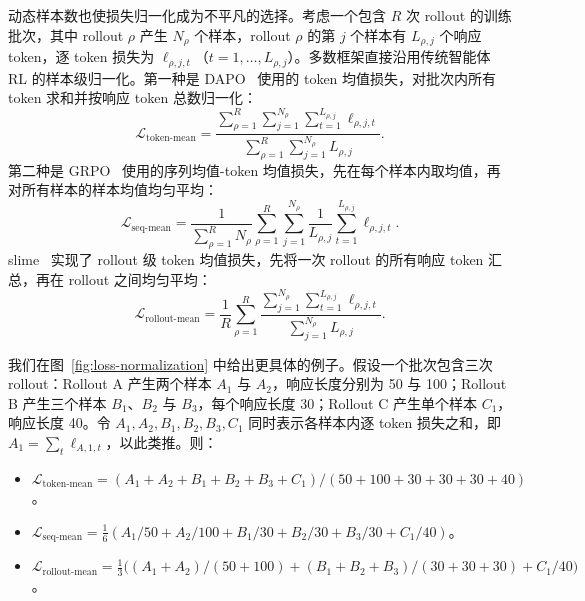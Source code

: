 动态样本数也使损失归一化成为不平凡的选择。考虑一个包含 $R$ 次 rollout 的训练批次，其中 rollout $\rho$ 产生 $N_\rho$ 个样本，rollout $\rho$ 的第 $j$ 个样本有 $L_{\rho,j}$ 个响应 token，逐 token 损失为 $\ell_{\rho,j,t}$（$t=1,\ldots,L_{\rho,j}$）。多数框架直接沿用传统智能体 RL 的样本级归一化。第一种是 DAPO~\cite{dapo} 使用的 token 均值损失，对批次内所有 token 求和并按响应 token 总数归一化：
\begin{equation}
  \mathcal{L}_{\mathrm{token\text{-}mean}}
  = \frac{\sum_{\rho=1}^{R}\sum_{j=1}^{N_\rho}\sum_{t=1}^{L_{\rho,j}}
    \ell_{\rho,j,t}}
    {\sum_{\rho=1}^{R}\sum_{j=1}^{N_\rho} L_{\rho,j}}.
  \label{eq:token-mean}
\end{equation}
第二种是 GRPO~\cite{deepseekmath} 使用的序列均值-token 均值损失，先在每个样本内取均值，再对所有样本的样本均值均匀平均：
\begin{equation}
  \mathcal{L}_{\mathrm{seq\text{-}mean}}
  = \frac{1}{\sum_{\rho=1}^{R} N_\rho}
    \sum_{\rho=1}^{R}\sum_{j=1}^{N_\rho}
    \frac{1}{L_{\rho,j}}\sum_{t=1}^{L_{\rho,j}} \ell_{\rho,j,t}.
  \label{eq:seq-mean}
\end{equation}
slime~\cite{slime} 实现了 rollout 级 token 均值损失，先将一次 rollout 的所有响应 token 汇总，再在 rollout 之间均匀平均：
\begin{equation}
  \mathcal{L}_{\mathrm{rollout\text{-}mean}}
  = \frac{1}{R}\sum_{\rho=1}^{R}
    \frac{\sum_{j=1}^{N_\rho}\sum_{t=1}^{L_{\rho,j}} \ell_{\rho,j,t}}
    {\sum_{j=1}^{N_\rho} L_{\rho,j}}.
  \label{eq:rollout-mean}
\end{equation}

我们在图~\ref{fig:loss-normalization} 中给出更具体的例子。假设一个批次包含三次 rollout：Rollout A 产生两个样本 $A_1$ 与 $A_2$，响应长度分别为 50 与 100；Rollout B 产生三个样本 $B_1$、$B_2$ 与 $B_3$，每个响应长度 30；Rollout C 产生单个样本 $C_1$，响应长度 40。令 $A_1,A_2,B_1,B_2,B_3,C_1$ 同时表示各样本内逐 token 损失之和，即 $A_1=\sum_t \ell_{A,1,t}$，以此类推。则：
\begin{itemize}
  \item $\mathcal{L}_{\mathrm{token\text{-}mean}}
  = (A_1+A_2+B_1+B_2+B_3+C_1)/(50+100+30+30+30+40)$。
  \item $\mathcal{L}_{\mathrm{seq\text{-}mean}}
  = \tfrac{1}{6}(A_1/50+A_2/100+B_1/30+B_2/30+B_3/30+C_1/40)$。
  \item $\mathcal{L}_{\mathrm{rollout\text{-}mean}}
  = \tfrac{1}{3}\bigl((A_1+A_2)/(50+100)+(B_1+B_2+B_3)/(30+30+30)+C_1/40\bigr)$。
\end{itemize}

